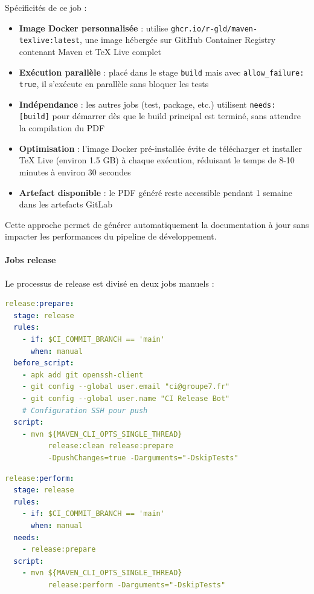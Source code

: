 Spécificités de ce job :
\begin{itemize}
    \item \textbf{Image Docker personnalisée} : utilise \texttt{ghcr.io/r-gld/maven-texlive:latest}, une image hébergée sur GitHub Container Registry contenant Maven et TeX Live complet
    \item \textbf{Exécution parallèle} : placé dans le stage \texttt{build} mais avec \texttt{allow\_failure: true}, il s'exécute en parallèle sans bloquer les tests
    \item \textbf{Indépendance} : les autres jobs (test, package, etc.) utilisent \texttt{needs: [build]} pour démarrer dès que le build principal est terminé, sans attendre la compilation du PDF
    \item \textbf{Optimisation} : l'image Docker pré-installée évite de télécharger et installer TeX Live (environ 1.5 GB) à chaque exécution, réduisant le temps de 8-10 minutes à environ 30 secondes
    \item \textbf{Artefact disponible} : le PDF généré reste accessible pendant 1 semaine dans les artefacts GitLab
\end{itemize}

Cette approche permet de générer automatiquement la documentation à jour sans impacter les performances du pipeline de développement.

\paragraph{Jobs release}

Le processus de release est divisé en deux jobs manuels :

\vspace{0.3cm}
\begin{lstlisting}[language=yaml, caption=Release prepare]
release:prepare:
  stage: release
  rules:
    - if: $CI_COMMIT_BRANCH == 'main'
      when: manual
  before_script:
    - apk add git openssh-client
    - git config --global user.email "ci@groupe7.fr"
    - git config --global user.name "CI Release Bot"
    # Configuration SSH pour push
  script:
    - mvn ${MAVEN_CLI_OPTS_SINGLE_THREAD}
          release:clean release:prepare
          -DpushChanges=true -Darguments="-DskipTests"
\end{lstlisting}

\begin{lstlisting}[language=yaml, caption=Release perform]
release:perform:
  stage: release
  rules:
    - if: $CI_COMMIT_BRANCH == 'main'
      when: manual
  needs:
    - release:prepare
  script:
    - mvn ${MAVEN_CLI_OPTS_SINGLE_THREAD}
          release:perform -Darguments="-DskipTests"
\end{lstlisting}

